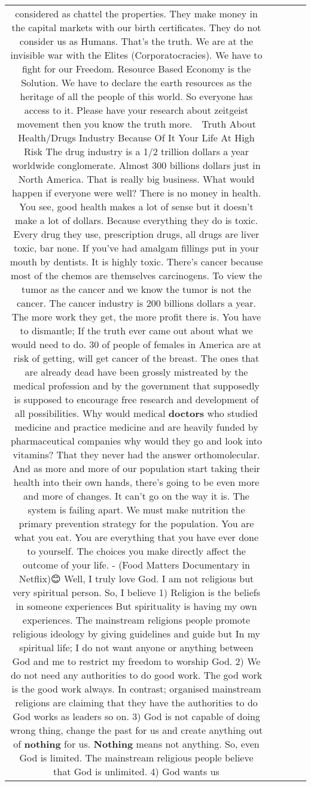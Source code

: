 \documentclass[11pt]{article}
\newlength\mylength
\begin{document}
\begin{center}
\begin{longtable}{|C{.65\mylength}|C{.30\mylength}|C{.12\mylength}|C{.12\mylength}|C{.12\mylength}|}
considered as chattel the properties. They make money in the capital markets with our birth certificates. They do not consider us as Humans. That's the truth. We are at the invisible war with the Elites (Corporatocracies). We have to fight for our Freedom. Resource Based Economy is the Solution. We have to declare the earth resources as the heritage of all the people of this world. So everyone has access to it. Please have your research about zeitgeist movement then you know the truth more.  Truth About Health/Drugs Industry Because Of It Your Life At High Risk The drug industry is a 1/2 trillion dollars a year worldwide conglomerate. Almost 300 billions dollars just in North America. That is really big business. What would happen if everyone were well? There is no money in health. You see, good health makes a lot of sense but it doesn't make a lot of dollars. Because everything they do is toxic. Every drug they use, prescription drugs, all drugs are liver toxic, bar none. If you've had amalgam fillings put in your mouth by dentists. It is highly toxic. There's cancer because most of the chemos are themselves carcinogens. To view the tumor as the cancer and we know the tumor is not the cancer. The cancer industry is 200 billions dollars a year. The more work they get, the more profit there is. You have to dismantle; If the truth ever came out about what we would need to do. 30 of people of females in America are at risk of getting, will get cancer of the breast. The ones that are already dead have been grossly mistreated by the medical profession and by the government that supposedly is supposed to encourage free research and development of all possibilities. Why would medical \textbf{doctors} who studied medicine and practice medicine and are heavily funded by pharmaceutical companies why would they go and look into vitamins? That they never had the answer orthomolecular. And as more and more of our population start taking their health into their own hands, there's going to be even more and more of changes. It can't go on the way it is. The system is failing apart. We must make nutrition the primary prevention strategy for the population. You are what you eat. You are everything that you have ever done to yourself. The choices you make directly affect the outcome of your life. - (Food Matters Documentary in Netflix)😊 Well, I truly love God. I am not religious but very spiritual person. So, I believe 1) Religion is the beliefs in someone experiences But spirituality is having my own experiences. The mainstream religions people promote religious ideology by giving guidelines and guide but In my spiritual life; I do not want anyone or anything between God and me to restrict my freedom to worship God. 2) We do not need any authorities to do good work. The god work is the good work always. In contrast; organised mainstream religions are claiming that they have the authorities to do God works as leaders so on. 3) God is not capable of doing wrong thing, change the past for us and create anything out of \textbf{nothing} for us. \textbf{Nothing} means not anything. So, even God is limited. The mainstream religious people believe that God is unlimited. 4) God wants us 
\end{longtable}
\end{center}
\end{document}
